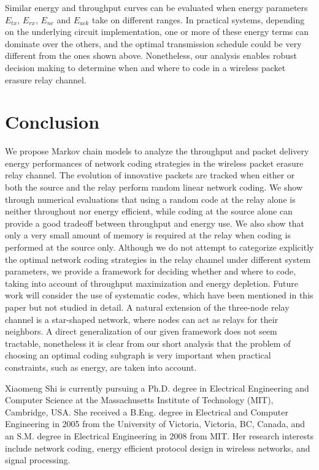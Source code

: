 \documentclass[journal, letterpaper]{IEEEtran}
\begin{document}
Similar energy and throughput curves can be evaluated when energy parameters $E_{tx}$, $E_{rx}$, $E_{nc}$ and $E_{ack}$ take on different ranges. In practical systems, depending on the underlying circuit implementation, one or more of these energy terms can dominate over the others, and the optimal transmission schedule could be very different from the ones shown above. Nonetheless, our analysis enables robust decision making to determine when and where to code in a wireless packet erasure relay channel.


\section{Conclusion}\label{sec:conclusion}
We propose Markov chain models to analyze the throughput and packet delivery energy performances of network coding strategies in the wireless packet erasure relay channel. The evolution of innovative packets are tracked when either or both the source and the relay perform random linear network coding. We show through numerical evaluations that using a random code at the relay alone is neither throughout nor energy efficient, while coding at the source alone can provide a good tradeoff between throughput and energy use. We also show that only a very small amount of memory is required at the relay when coding is performed at the source only. Although we do not attempt to categorize explicitly the optimal network coding strategies in the relay channel under different system parameters, we provide a framework for deciding whether and where to code, taking into account of throughput maximization and energy depletion. Future work will consider the use of systematic codes, which have been mentioned in this paper but not studied in detail. A natural extension of the three-node relay channel is a star-shaped network, where nodes can  act as relays for their neighbors. A direct generalization of our given framework does not seem tractable, nonetheless it is clear from our short analysis that the problem of choosing an optimal coding subgraph is very important when practical constraints, such as energy, are taken into account.







\begin{IEEEbiography}
{Xiaomeng Shi}
is currently pursuing a Ph.D. degree in Electrical Engineering and Computer Science at the Massachusetts Institute of Technology (MIT), Cambridge, USA. She received a B.Eng. degree in Electrical and Computer Engineering in 2005 from the University of Victoria, Victoria, BC, Canada, and an S.M. degree in Electrical Engineering in 2008 from MIT. Her research interests include network coding, energy efficient protocol design in wireless networks, and signal processing.
\end{IEEEbiography}
\end{document}
